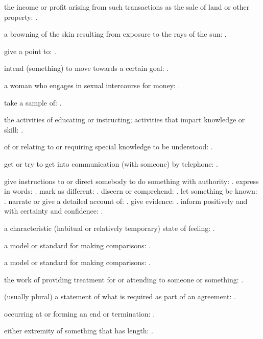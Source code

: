   the income or profit arising from such transactions as the sale of land or other property: .

  a browning of the skin resulting from exposure to the rays of the sun: .

  give a point to: .

  intend (something) to move towards a certain goal: .

  a woman who engages in sexual intercourse for money: .

  take a sample of: .

  the activities of educating or instructing; activities that impart knowledge or skill: .

  of or relating to or requiring special knowledge to be understood: .

  get or try to get into communication (with someone) by telephone: .

  give instructions to or direct somebody to do something with authority: . express in words: . mark as different: . discern or comprehend: . let something be known: . narrate or give a detailed account of: . give evidence: . inform positively and with certainty and confidence: .

  a characteristic (habitual or relatively temporary) state of feeling: .

  a model or standard for making comparisons: .

  a model or standard for making comparisons: .

  the work of providing treatment for or attending to someone or something: .

  (usually plural) a statement of what is required as part of an agreement: .

  occurring at or forming an end or termination: .

  either extremity of something that has length: .

